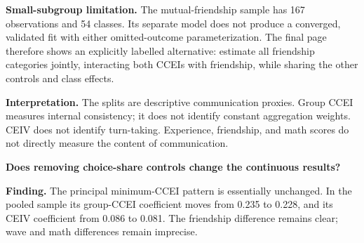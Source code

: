 \documentclass[11pt]{article}
\begin{document}
\textbf{Small-subgroup limitation.} The mutual-friendship sample has 167 observations and 54 classes.
Its separate model does not produce a converged, validated fit with either omitted-outcome parameterization.
The final page therefore shows an explicitly labelled alternative: estimate all friendship categories jointly,
interacting both CCEIs with friendship, while sharing the other controls and class effects.

\textbf{Interpretation.} The splits are descriptive communication proxies. Group CCEI measures internal
consistency; it does not identify constant aggregation weights. CEIV does not identify turn-taking.
Experience, friendship, and math scores do not directly measure the content of communication.
\clearpage
\begin{center}\Large\textbf{Does removing choice-share controls change the continuous results?}\end{center}
\textbf{Finding.} The principal minimum-CCEI pattern is essentially unchanged. In the pooled sample its
group-CCEI coefficient moves from 0.235 to 0.228, and its CEIV coefficient from 0.086 to 0.081.
The friendship difference remains clear; wave and math differences remain imprecise.
\end{document}
